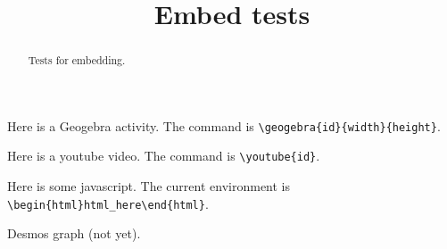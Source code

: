 \documentclass{ximera}
\title{Embed tests}
\begin{document}
	
\begin{abstract}
Tests for embedding.
\end{abstract}

\maketitle

Here is a Geogebra activity. The command is \verb+\geogebra{id}{width}{height}+.


Here is a youtube video. The command is \verb+\youtube{id}+.


Here is some javascript. The current environment is \verb+\begin{html}html_here\end{html}+.


Desmos graph (not yet).


\end{document}
